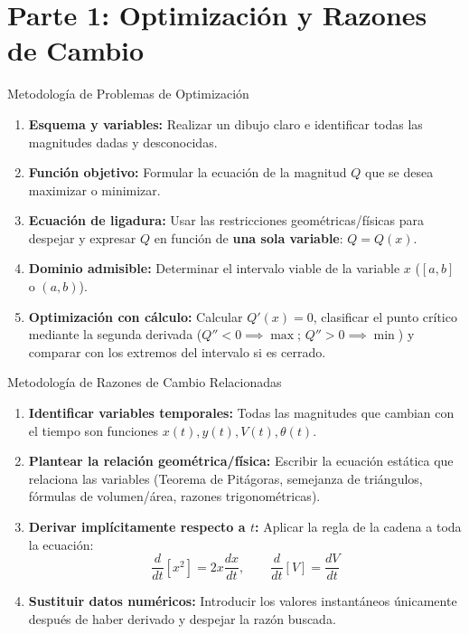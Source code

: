 \documentclass[aspectratio=169]{beamer}
\begin{document}
\begin{frame}[plain]
  \titlepage
\end{frame}

\section{Parte 1: Optimización y Razones de Cambio}


\begin{frame}{Metodología de Problemas de Optimización}
  \begin{mwpasos}
    \begin{enumerate}
      \item \textbf{Esquema y variables:} Realizar un dibujo claro e identificar todas las magnitudes dadas y desconocidas.
      \item \textbf{Función objetivo:} Formular la ecuación de la magnitud $Q$ que se desea maximizar o minimizar.
      \item \textbf{Ecuación de ligadura:} Usar las restricciones geométricas/físicas para despejar y expresar $Q$ en función de \textbf{una sola variable}: $Q = Q(x)$.
      \item \textbf{Dominio admisible:} Determinar el intervalo viable de la variable $x$ ($[a, b]$ o $(a, b)$).
      \item \textbf{Optimización con cálculo:} Calcular $Q'(x) = 0$, clasificar el punto crítico mediante la segunda derivada ($Q'' < 0 \implies \max$; $Q'' > 0 \implies \min$) y comparar con los extremos del intervalo si es cerrado.
    \end{enumerate}
  \end{mwpasos}
\end{frame}

\begin{frame}{Metodología de Razones de Cambio Relacionadas}
  \begin{mwpasos}
    \begin{enumerate}
      \item \textbf{Identificar variables temporales:} Todas las magnitudes que cambian con el tiempo son funciones $x(t), y(t), V(t), \theta(t)$.
      \item \textbf{Plantear la relación geométrica/física:} Escribir la ecuación estática que relaciona las variables (Teorema de Pitágoras, semejanza de triángulos, fórmulas de volumen/área, razones trigonométricas).
      \item \textbf{Derivar implícitamente respecto a $t$:} Aplicar la regla de la cadena a toda la ecuación:
            $$\frac{d}{dt}[x^2] = 2x \frac{dx}{dt}, \qquad \frac{d}{dt}[V] = \frac{dV}{dt}$$
      \item \textbf{Sustituir datos numéricos:} Introducir los valores instantáneos \alert{únicamente después de haber derivado} y despejar la razón buscada.
    \end{enumerate}
  \end{mwpasos}
\end{frame}
\end{document}
